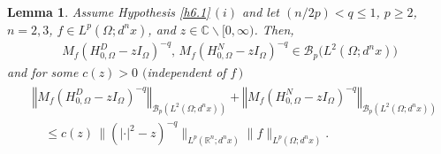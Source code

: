 \documentclass[reqno,10pt, centertags]{amsart}
\newcommand{\bbR}{{\mathbb{R}}}
\newcommand{\bbC}{{\mathbb{C}}}
\newcommand{\cB}{{\mathcal B}}
\newcommand{\abs}[1]{\left\lvert#1\right\rvert}
\newcommand{\norm}[1]{\left\Vert#1\right\Vert}
\newcommand{\lb}{\label}
\newcommand{\Om}{\Omega}
\numberwithin{equation}{section}
\newtheorem{lemma}[theorem]{Lemma}
\theoremstyle{definition}
\begin{document}
\begin{lemma} \lb{l6.2}
Assume Hypothesis \ref{h6.1}\,$(i)$ and let $(n/2p)<q\leq1$, $p\geq
2$, $n=2, 3$, $f\in L^p(\Om;d^nx)$, and
$z\in\bbC\backslash[0,\infty)$. Then,
\begin{align} \lb{6.11}
M_f(H_{0,\Om}^D-zI_{\Om})^{-q}, \, M_f(H_{0,\Om}^N-zI_{\Om})^{-q}
\in\cB_p\big(L^2(\Om;d^nx)\big)
\end{align}
and for some $c(z)>0$ $($independent of $f$\,$)$
\begin{align}
\begin{split}
&\norm{M_f(H_{0,\Om}^D-zI_{\Om})^{-q}}_{\cB_p(L^2(\Om;d^nx))}+
\norm{M_f(H_{0,\Om}^N-zI_{\Om})^{-q}}_{\cB_p(L^2(\Om;d^nx))}   \\
& \quad \leq c(z)\, \|(\abs{\cdot}^2-z)^{-q}\|_{L^p(\bbR^n;d^nx)}
\|f\|_{L^p(\Om;d^nx)}. \lb{6.12}
\end{split}
\end{align}
\end{lemma}
\end{document}
